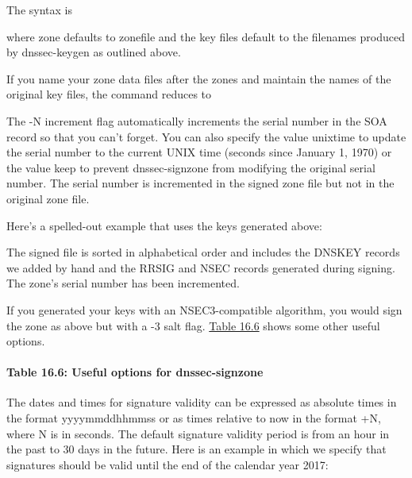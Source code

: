 The syntax
is\protect\hypertarget{part0024_split_064.htmlux5cux23_idIndexMarker2266}{}{}\protect\hypertarget{part0024_split_064.htmlux5cux23_idIndexMarker2267}{}{}


where {zone} defaults to {zonefile} and the key files default to the
filenames produced by {dnssec-keygen} as outlined above.

If you name your zone data files after the zones and maintain the names
of the original key files, the command reduces to


The {-N increment }flag automatically increments the serial number in
the SOA record so that you can't forget. You can also specify the value
{unixtime} to update the serial number to the current UNIX time (seconds
since January 1, 1970) or the value {keep} to prevent {dnssec-signzone}
from modifying the original serial number. The serial number is
incremented in the signed zone file but not in the original zone file.

Here's a spelled-out example that uses the keys generated above:


The signed file is sorted in alphabetical order and includes the DNSKEY
records we added by hand and the RRSIG and NSEC records generated during
signing. The zone's serial number has been incremented.

If you generated your keys with an NSEC3-compatible algorithm, you would
sign the zone as above but with a {-3} {salt} flag.
\protect\hyperlink{part0024_split_064.htmlux5cux23_idTextAnchor944}{Table
16.6} shows some other useful options.

\paragraph[{Table 16.6: }Useful options for
{dnssec-signzone}]{\texorpdfstring{{Table 16.6:
}\protect\hypertarget{part0024_split_064.htmlux5cux23_idTextAnchor944}{}{}Useful
options for
{dnssec-signzone}}{Table 16.6: Useful options for dnssec-signzone}}


The dates and times for signature validity can be expressed as absolute
times in the format {yyyymmddhhmmss} or as times relative to now in the
format {+}{N}, where {N} is in seconds. The default signature validity
period is from an hour in the past to 30 days in the future. Here is an
example in which we specify that signatures should be valid until the
end of the calendar year 2017:

